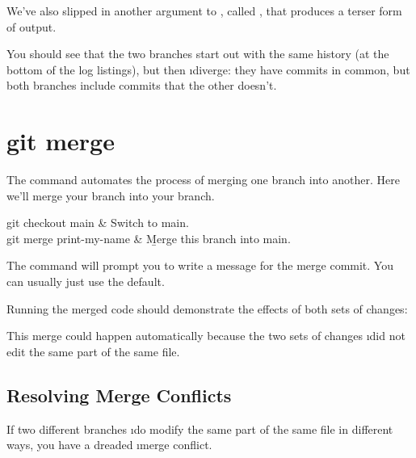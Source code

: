 \documentclass[letterpaper, 12pt, titlepage, twoside]{article}
\begin{document}
We've also slipped in another argument to , called ,
that produces a terser form of output.

You should see that the two branches start out with the same history (at the
bottom of the log listings), but then \i{diverge}: they have commits in
common, but both branches include commits that the other doesn't.


\section{git merge}


The \x {} command automates the process of merging one branch into
another. Here we'll merge your  branch into your 
branch.

\begin{typeme}
git checkout main & Switch to main. \\
git merge print-my-name & \b{Merge this branch into main.} \\
\end{typeme}

The  command will prompt you to write a message for the merge
commit. You can usually just use the default.

Running the merged code should demonstrate the effects of both sets of
changes:


This merge could happen automatically because the two sets of changes \i{did
  not edit the same part of the same file}.

\subsection*{Resolving Merge Conflicts}

If two different branches \i{do} modify the same part of the same file in
different ways, you have a dreaded \i{merge conflict}.

\end{document}
